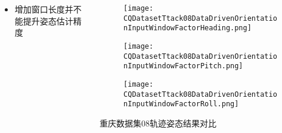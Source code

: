 \begin{frame}
\begin{columns}[t]
\begin{column}{0.6\textwidth}
\begin{itemize}
				\item 增加窗口长度并不能提升姿态估计精度
			\end{itemize}
		\end{column} 
		\begin{column}{0.4\textwidth}
    		\vspace{-1.0cm}  
		   	\begin{figure}
    			\texttt{[image: CQDatasetTtack08DataDrivenOrientationInputWindowFactorHeading.png]}
		   	\end{figure}
		   	\vspace{-0.5cm}
		   	\begin{figure}
				\texttt{[image: CQDatasetTtack08DataDrivenOrientationInputWindowFactorPitch.png]}
		   	\end{figure}
		   	\vspace{-0.5cm}
		   	\begin{figure}
				\texttt{[image: CQDatasetTtack08DataDrivenOrientationInputWindowFactorRoll.png]}
		   	\end{figure} 
		   	\vspace{-0.4cm}
		   	{\footnotesize 重庆数据集08轨迹姿态结果对比}
		\end{column}    
	\end{columns}
\end{frame}

